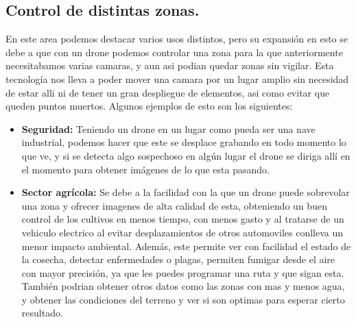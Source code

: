 \subsection{Control de distintas zonas.}
\hspace{1 cm} En este area podemos destacar varios usos distintos, pero su expansi\'on en esto se debe a que con un drone podemos controlar una zona para la que anteriormente necesitabamos varias camaras, y aun asi podian quedar zonas sin vigilar. Esta tecnolog\'ia nos lleva a poder mover una camara por un lugar amplio sin necesidad de estar alli ni de tener un gran despliegue de elementos, asi como evitar que queden puntos muertos. Algunos ejemplos de esto son los siguientes: 


\begin{itemize}
	\item\textbf{Seguridad:} Teniendo un drone en un lugar como pueda ser una nave industrial, podemos hacer que este se desplace grabando en todo momento lo que ve, y si se detecta algo sospechoso en alg\'un lugar el drone se diriga all\'i en el momento para obtener im\'agenes de lo que esta pasando. 
	
	\item \textbf{Sector agr\'icola:} Se debe a la facilidad con la que un drone puede sobrevolar una zona y ofrecer imagenes de alta calidad de esta, obteniendo un buen control de los cultivos en menos tiempo, con menos gasto y al tratarse de un vehiculo electrico al evitar desplazamientos de otros automoviles conlleva un menor impacto ambiental. Adem\'as, este permite ver con facilidad el estado de la cosecha, detectar enfermedades o plagas, permiten fumigar desde el aire con mayor precisi\'on, ya que les puedes programar una ruta y que sigan esta. Tambi\'en podrian obtener otros datos como las zonas con mas y menos agua, y obtener las condiciones del terreno y ver si son optimas para esperar cierto resultado.
	

\end{itemize}
